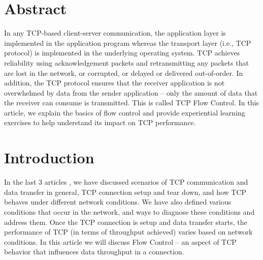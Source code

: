 \begin{multicols}{2}

\section*{Abstract} 
In any TCP-based client-server communication, the application layer is implemented in the application program whereas the transport layer (i.e., TCP protocol) is implemented in the underlying operating system. TCP achieves reliability using acknowledgement packets and retransmitting any packets that are lost in the network, or corrupted, or delayed or delivered out-of-order. In addition, the TCP protocol ensures that the receiver application is not overwhelmed by data from the sender application – only the amount of data that the receiver can consume is transmitted. This is called TCP Flow Control. In this article, we explain the basics of flow control and provide experiential learning exercises to help understand its impact on TCP performance.

\section{Introduction}
In the last 3 articles \cite{art3-key04}\cite{art3-key05}\cite{art3-key06}, we have discussed scenarios of TCP communication and data transfer in general, TCP connection setup and tear down, and how TCP behaves under different network conditions. We have also defined various conditions that occur in the network, and ways to diagnose these conditions and address them. Once the TCP connection is setup and data transfer starts, the performance of TCP (in terms of throughput achieved) varies based on network conditions. In this article we will discuss Flow Control – an aspect of TCP behavior that influences data throughput in a connection.


\end{multicols}
